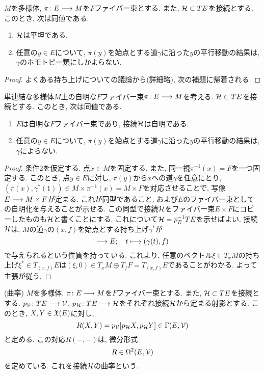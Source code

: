 \begin{thm}
$M$を多様体, $\pi \colon E \longrightarrow M$を$F$ファイバー束とする.
また, $\mathcal{H} \subset TE$を接続とする.
このとき, 次は同値である.
\begin{enumerate}
\item
$\mathcal{H}$は平坦である.
\item
任意の$y \in E$について, $\pi(y)$を始点とする道$\gamma$に沿った$y$の平行移動の結果は, $\gamma$のホモトピー類にしかよらない.
\end{enumerate}
\end{thm}

\begin{proof}
よくある持ち上げについての議論から(詳細略), 次の補題に帰着される.
\end{proof}

\begin{lem}
単連結な多様体$M$上の自明な$F$ファイバー束$\pi \colon E \longrightarrow M$を考える.
$\mathcal{H} \subset TE$を接続とする.
このとき, 次は同値である.
\begin{enumerate}
\item $E$は自明な$F$ファイバー束であり, 接続$\mathcal{H}$は自明である.
\item 任意の$y \in E$について, $\pi(y)$を始点とする道$\gamma$に沿った$y$の平行移動の結果は, $\gamma$によらない.
\end{enumerate}
\end{lem}

\begin{proof}
条件2を仮定する.
点$x \in M$を固定する.
また, 同一視$\pi^{-1}(x) = F$を一つ固定する.
このとき, 点$y \in E$に対し, $\pi(y)$から$x$への道$\gamma$を任意にとり,
$(\pi(x), \gamma^*(1)) \in M \times \pi^{-1}(x) = M \times F$を対応させることで,
写像$E \longrightarrow M \times F$が定まる.
これが同型であること, および$E$のファイバー束としての自明化を与えることが示せる.
この同型で接続$\mathcal{H}$をファイバー束$E \times F$にコピーしたものも$\mathcal{H}$と書くことにする.
これについて$\mathcal{H} = p_E^{-1}TE$を示せばよい.
接続$\mathcal{H}$は, $M$の道$\gamma$の$(x, f)$を始点とする持ち上げ$\gamma^*$が
\begin{equation}
[0, 1] \lra E;\quad t \lmt (\gamma(t), f)
\end{equation}
で与えられるという性質を持っている.
これより, 任意のベクトル$\xi \in T_xM$の持ち上げ$\xi^* \in T_{(x, f)}E$は$(\xi, 0) \in T_xM \oplus T_fF = T_{(x,f)}E$であることがわかる.
よって主張が従う.
\end{proof}

\begin{dfn}(曲率)
$M$を多様体, $\pi \colon E \longrightarrow M$を$F$ファイバー束とする.
また, $\mathcal{H} \subset TE$を接続とする.
$p_{\mathcal{V}} \colon TE \longrightarrow \mathcal{V}$, $p_{\mathcal{H}} \colon TE \longrightarrow \mathcal{H}$をそれぞれ接続$\mathcal{H}$から定まる射影とする.
このとき, $X, Y \in \mathfrak{X}(E)$に対し,
\begin{equation}
  R(X,Y) = p_{\mathcal{V}}[p_{\mathcal{H}} X, p_{\mathcal{H}} Y] \in \Gamma(E, \mathcal{V})
\end{equation}
と定める.
この対応$R(-,-)$は, 微分形式
\begin{equation}
  R \in \Omega^2(E, \mathcal{V})
\end{equation}
を定めている.
これを接続$\mathcal{H}$の曲率という.
\end{dfn}

